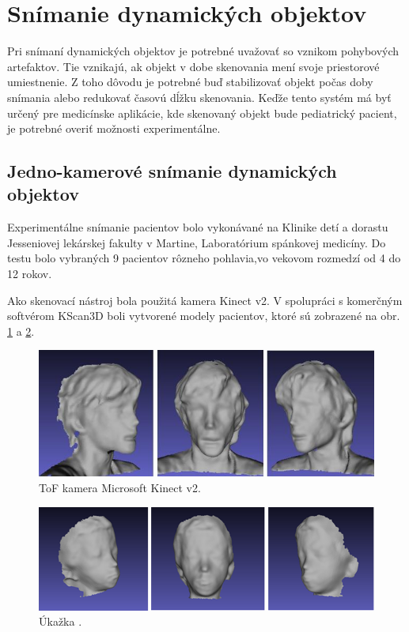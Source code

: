 \section{Snímanie dynamických objektov}

Pri snímaní dynamických objektov je potrebné uvažovať so vznikom pohybových artefaktov. Tie vznikajú, ak objekt v dobe skenovania mení svoje priestorové umiestnenie. Z toho dôvodu je potrebné buď stabilizovať objekt počas doby snímania alebo redukovať časovú dĺžku skenovania. Keďže tento systém má byť určený pre medicínske aplikácie, kde skenovaný objekt bude pediatrický pacient, je potrebné overiť možnosti experimentálne.


\subsection{Jedno-kamerové snímanie dynamických objektov}

Experimentálne snímanie pacientov bolo vykonávané na Klinike detí a dorastu Jesseniovej lekárskej fakulty v Martine, Laboratórium spánkovej medicíny. Do testu bolo vybraných 9 pacientov rôzneho pohlavia,vo vekovom rozmedzí od 4 do 12 rokov. 

Ako skenovací nástroj bola použitá kamera Kinect v2. V spolupráci s komerčným softvérom KScan3D boli vytvorené modely pacientov, ktoré sú zobrazené na obr. \ref{fig:dynamic_patient:a} a \ref{fig:dynamic_patient:b}. 

\begin{figure}[H]
	\centering
	\includegraphics[width=\textwidth]{figures/dynamic_patient_a.png}
	\caption{ToF kamera Microsoft Kinect v2.}
	\label{fig:dynamic_patient:a}
\end{figure}

\begin{figure}[H]
	\centering
	\includegraphics[width=\textwidth]{figures/dynamic_patient_b.png}
	\caption{Úkažka .}
	\label{fig:dynamic_patient:b}
\end{figure}

